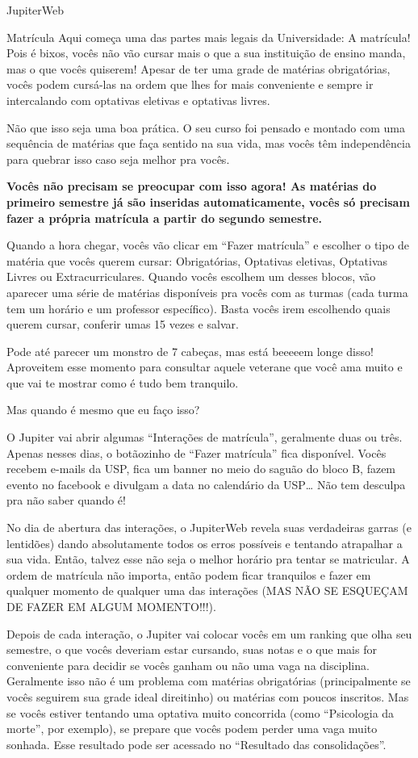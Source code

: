 \begin{secao}{JupiterWeb}
\begin{subsecao}{Matrícula}
Aqui começa uma das partes mais legais da Universidade: A matrícula! Pois é
bixos, vocês não vão cursar mais o que a sua instituição de ensino manda, mas o
que vocês quiserem! Apesar de ter uma grade de matérias obrigatórias, vocês
podem cursá-las na ordem que lhes for mais conveniente e sempre ir intercalando
com optativas eletivas e optativas livres.

Não que isso seja uma boa prática. O seu curso foi pensado e montado com uma
sequência de matérias que faça sentido na sua vida, mas vocês têm independência
para quebrar isso caso seja melhor pra vocês.

\textbf{Vocês não precisam se preocupar com isso agora! As matérias do primeiro
semestre já são inseridas automaticamente, vocês só precisam fazer a própria
matrícula a partir do segundo semestre.}

Quando a hora chegar, vocês vão clicar em “Fazer matrícula” e escolher o tipo de
matéria que vocês querem cursar: Obrigatórias, Optativas eletivas, Optativas
Livres ou Extracurriculares. Quando vocês escolhem um desses blocos, vão
aparecer uma série de matérias disponíveis pra vocês com as turmas (cada turma
tem um horário e um professor específico). Basta vocês irem escolhendo quais
querem cursar, conferir umas 15 vezes e salvar.

Pode até parecer um monstro de 7 cabeças, mas está beeeeem longe disso!
Aproveitem esse momento para consultar aquele veterane que você ama muito e que
vai te mostrar como é tudo bem tranquilo.

Mas quando é mesmo que eu faço isso?

O Jupiter vai abrir algumas “Interações de matrícula”, geralmente duas ou três.
Apenas nesses dias, o botãozinho de “Fazer matrícula” fica disponível. Vocês
recebem e-mails da USP, fica um banner no meio do saguão do bloco B, fazem
evento no facebook e divulgam a data no calendário da USP… Não tem desculpa pra
não saber quando é!

No dia de abertura das interações, o JupiterWeb revela suas verdadeiras garras
(e lentidões) dando absolutamente todos os erros possíveis e tentando
atrapalhar a sua vida. Então, talvez esse não seja o melhor horário pra tentar
se matricular. A ordem de matrícula não importa, então podem ficar tranquilos e
fazer em qualquer momento de qualquer uma das interações (MAS NÃO SE ESQUEÇAM DE
FAZER EM ALGUM MOMENTO!!!).

Depois de cada interação, o Jupiter vai colocar vocês em um ranking que olha seu
semestre, o que vocês deveriam estar cursando, suas notas e o que mais for
conveniente para decidir se vocês ganham ou não uma vaga na disciplina.
Geralmente isso não é um problema com matérias obrigatórias (principalmente se
vocês seguirem sua grade ideal direitinho) ou matérias com poucos inscritos. Mas
se vocês estiver tentando uma optativa muito concorrida (como ``Psicologia da
morte'', por exemplo), se prepare que vocês podem perder uma vaga muito sonhada.
Esse resultado pode ser acessado no ``Resultado das consolidações''.


\end{subsecao}
\end{secao}
